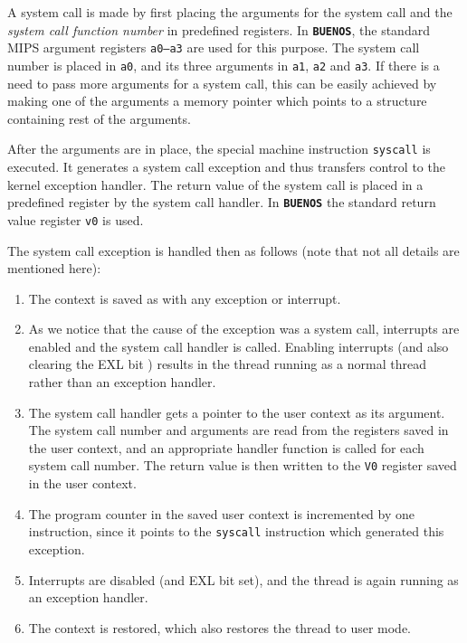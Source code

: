 \documentclass[twoside,a4paper]{report}
\newcommand{\buenos}{\texttt{\textbf{BUENOS}}}
\begin{document}
A system call is made by first placing the arguments for the system
call and the \emph{system call function number}  in predefined registers. In \buenos{}, the standard MIPS
argument registers \texttt{a0--a3}  are used for
this purpose. The system call number is placed in \texttt{a0}, and its
three arguments in \texttt{a1}, \texttt{a2} and \texttt{a3}. If there
is a need to pass more arguments for a system call, this can be easily
achieved by making one of the arguments a memory pointer which points
to a structure containing rest of the arguments.

After the arguments are in place, the special machine instruction
\texttt{syscall} is executed. It generates a system call exception and
thus transfers control to the kernel exception handler. The return
value of the system call is placed in a predefined register by the
system call handler. In \buenos{} the standard return value register
\texttt{v0}  is used.

The system call exception is handled then as follows (note that not
all details are mentioned here):

\begin{enumerate}
\item The context is saved as with any exception or interrupt.

\item As we notice that the cause of the exception was a system call,
interrupts are enabled and the system call handler is called. Enabling
interrupts (and also clearing the EXL bit ) results in
the thread running as a normal thread rather than an exception
handler.

\item The system call handler gets a pointer to the user context as
its argument. The system call number and arguments are read from the
registers saved in the user context, and an appropriate handler
function is called for each system call number. The return value is
then written to the \texttt{V0} register saved in the user context.

\item The program counter in the saved user context is incremented by
one instruction, since it points to the \texttt{syscall} instruction
which generated this exception.

\item Interrupts are disabled (and EXL bit set), and the thread is
again running as an exception handler.

\item The context is restored, which also restores the thread to user
mode.

\end{enumerate}
\end{document}

